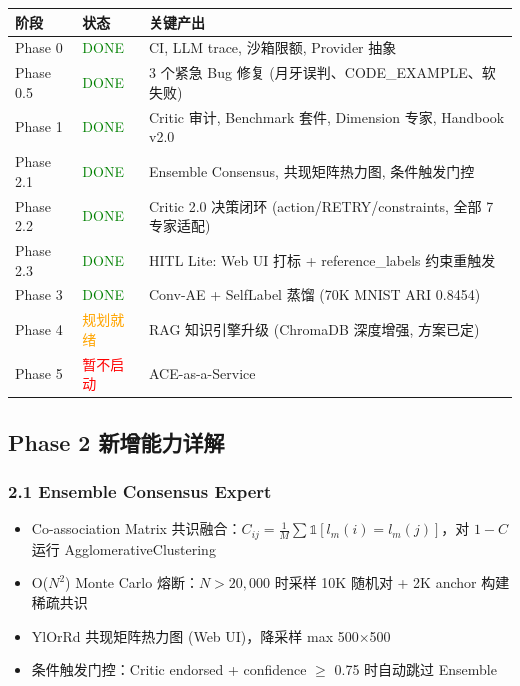 \documentclass[12pt,a4paper]{article}
\begin{document}
\begin{table}[H]
\centering
\begin{tabular}{@{}lp{3cm}p{6.5cm}@{}}
\toprule
\textbf{阶段} & \textbf{状态} & \textbf{关键产出} \\
\midrule
Phase 0 & \textcolor{green}{DONE} & CI, LLM trace, 沙箱限额, Provider 抽象 \\
Phase 0.5 & \textcolor{green}{DONE} & 3 个紧急 Bug 修复 (月牙误判、CODE\_EXAMPLE、软失败) \\
Phase 1 & \textcolor{green}{DONE} & Critic 审计, Benchmark 套件, Dimension 专家, Handbook v2.0 \\
Phase 2.1 & \textcolor{green}{DONE} & Ensemble Consensus, 共现矩阵热力图, 条件触发门控 \\
Phase 2.2 & \textcolor{green}{DONE} & Critic 2.0 决策闭环 (action/RETRY/constraints, 全部 7 专家适配) \\
Phase 2.3 & \textcolor{green}{DONE} & HITL Lite: Web UI 打标 + reference\_labels 约束重触发 \\
Phase 3 & \textcolor{green}{DONE} & Conv-AE + SelfLabel 蒸馏 (70K MNIST ARI 0.8454) \\
Phase 4 & \textcolor{orange}{规划就绪} & RAG 知识引擎升级 (ChromaDB 深度增强, 方案已定) \\
Phase 5 & \textcolor{red}{暂不启动} & ACE-as-a-Service \\
\bottomrule
\end{tabular}
\end{table}

\subsection{Phase 2 新增能力详解}

\subsubsection{2.1 Ensemble Consensus Expert}
\begin{itemize}[nosep]
    \item Co-association Matrix 共识融合：$C_{ij} = \frac{1}{M} \sum \mathbb{1}[l_m(i) = l_m(j)]$，对 $1-C$ 运行 AgglomerativeClustering
    \item O($N^2$) Monte Carlo 熔断：$N > 20,000$ 时采样 10K 随机对 + 2K anchor 构建稀疏共识
    \item YlOrRd 共现矩阵热力图 (Web UI)，降采样 max 500$\times$500
    \item 条件触发门控：Critic endorsed + confidence $\ge$ 0.75 时自动跳过 Ensemble
\end{itemize}
\end{document}
